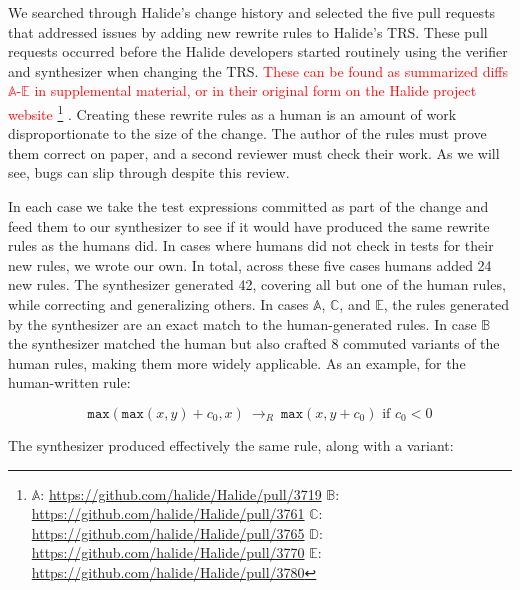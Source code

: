 \documentclass[acmsmall,review]{acmart}\settopmatter{printfolios=true,printccs=false,printacmref=false}
\newcommand{\modified}[1]{\textcolor{red}{{#1}}}
\newcommand{\hmax}[0]{\texttt{max}}
\newcommand{\rewrites}[0]{\:\rightarrow_{R}\:}
\newcommand{\pred}[0]{\textrm{ if }}
\begin{document}


We searched through Halide’s change history and selected the five pull requests that addressed issues by adding new rewrite rules to Halide’s TRS. These pull requests occurred before the Halide developers started routinely using the verifier and synthesizer when changing the TRS. \modified{These can be found as summarized diffs $\mathbb{A}$-$\mathbb{E}$ in supplemental material, or in their original form on the Halide project website
\footnote{
$\mathbb{A}$: \url{https://github.com/halide/Halide/pull/3719}
$\mathbb{B}$: \url{https://github.com/halide/Halide/pull/3761}
$\mathbb{C}$: \url{https://github.com/halide/Halide/pull/3765}
$\mathbb{D}$: \url{https://github.com/halide/Halide/pull/3770}
$\mathbb{E}$: \url{https://github.com/halide/Halide/pull/3780}
}}
. Creating these rewrite rules as a human is an amount of work disproportionate to the size of the change. The author of the rules must prove them correct on paper, and a second reviewer must check their work. As we will see, bugs can slip through despite this review. 

In each case we take the test expressions committed as part of the change and feed them to our synthesizer to see if it would have produced the same rewrite rules as the humans did. In cases where humans did not check in tests for their new rules, we wrote our own. In total, across these five cases humans added 24 new rules. The synthesizer generated 42, covering all but one of the human rules, while correcting and generalizing others. In cases $\mathbb{A}$, $\mathbb{C}$, and $\mathbb{E}$, the rules generated by the synthesizer are an exact match to the human-generated rules. In case $\mathbb{B}$ the synthesizer matched the human but also crafted 8 commuted variants of the human rules, making them more widely applicable. As an example, for the human-written rule:

\[
\hmax(\hmax(x, y) + c_0, x) \rewrites \hmax(x, y + c_0) \pred c_0 < 0
\]

The synthesizer produced effectively the same rule, along with a variant:
\end{document}
